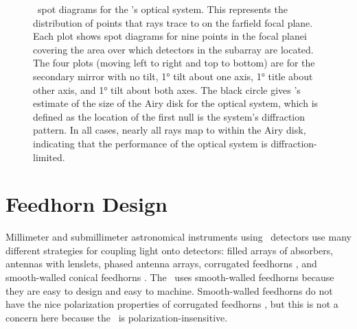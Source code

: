 \begin{figure}[th]
\begin{tabular}{lr}
\end{tabular}
\caption{
\ZEMAX\ spot diagrams for the \Imager's optical system.
This represents the distribution of points that rays trace to on the farfield focal plane.
Each plot shows spot diagrams for nine points in the focal planei covering the area over which detectors in the subarray are located.
The four plots (moving left to right and top to bottom) are for the secondary mirror with no tilt, \ang{1} tilt about one axis, \ang{1} title about other axis, and \ang{1} tilt about both axes.
The black circle gives \ZEMAX's estimate of the size of the Airy disk for the optical system, which is defined as the location of the first null is the system's diffraction pattern.
In all cases, nearly all rays map to within the Airy disk, indicating that the performance of the optical system is diffraction-limited.
}
\label{fig:ch4-reso-comp}
\end{figure}


\section{Feedhorn Design}\label{sec:ch4-feedhorn-design}


Millimeter and submillimeter astronomical instruments using \TES\ detectors use many different strategies for coupling light onto detectors: filled arrays of absorbers\cite{swetz_overview_2011,holland_scuba-2:_2013}, antennas with lenslets\cite{keating_ultra_2011}, phased antenna arrays\cite{obrient_antenna-coupled_2012}, corrugated feedhorns \cite{austermann_sptpol:_2012,niemack_actpol:_2010}, and smooth-walled conical feedhorns \cite{schwan_invited_2011,spt}.
The \Imager\ uses smooth-walled feedhorns because they are easy to design and easy to machine.
Smooth-walled feedhorns do not have the nice polarization properties of corrugated feedhorns \cite{clarricoats_corrugated_1984}, but this is not a concern here because the \Imager\ is polarization-insensitive.

